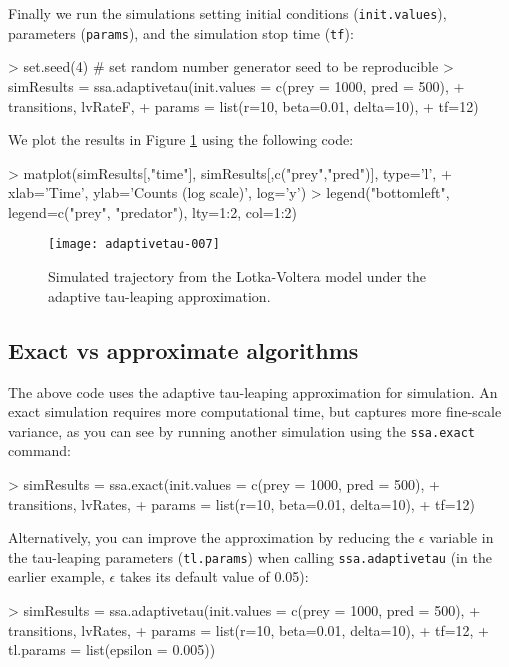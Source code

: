 \documentclass[11pt,nogin]{article}
\begin{document}
Finally we run the simulations setting initial conditions (\texttt{init.values}), parameters (\texttt{params}), and the simulation stop time (\texttt{tf}):
\begin{Schunk}
\begin{Sinput}
> set.seed(4) # set random number generator seed to be reproducible
> simResults = ssa.adaptivetau(init.values = c(prey = 1000, pred = 500),
+                              transitions, lvRateF,
+                              params = list(r=10, beta=0.01, delta=10),
+                              tf=12)
\end{Sinput}
\end{Schunk}
We plot the results in Figure \ref{fig-lv} using the following code:
\begin{Schunk}
\begin{Sinput}
> matplot(simResults[,"time"], simResults[,c("prey","pred")], type='l',
+         xlab='Time', ylab='Counts (log scale)', log='y')
> legend("bottomleft", legend=c("prey", "predator"), lty=1:2, col=1:2)
\end{Sinput}
\end{Schunk}

\begin{figure}
  \centerline{
\texttt{[image: adaptivetau-007]}
}\caption{\label{fig-lv} Simulated trajectory from the Lotka-Voltera model under the adaptive tau-leaping approximation.}
\end{figure}

\subsection*{Exact vs approximate algorithms}
The above code uses the adaptive tau-leaping approximation for simulation.  An exact simulation requires more computational time, but captures more fine-scale variance, as you can see by running another simulation using the \texttt{ssa.exact} command:
\begin{Schunk}
\begin{Sinput}
> simResults = ssa.exact(init.values = c(prey = 1000, pred = 500),
+                        transitions, lvRates,
+                        params = list(r=10, beta=0.01, delta=10),
+                        tf=12)
\end{Sinput}
\end{Schunk}
Alternatively, you can improve the approximation by reducing the $\epsilon$ variable in the tau-leaping parameters (\texttt{tl.params}) when calling \texttt{ssa.adaptivetau} (in the earlier example, $\epsilon$ takes its default value of 0.05):
\begin{Schunk}
\begin{Sinput}
> simResults = ssa.adaptivetau(init.values = c(prey = 1000, pred = 500),
+                              transitions, lvRates,
+                              params = list(r=10, beta=0.01, delta=10),
+                              tf=12,
+                              tl.params = list(epsilon = 0.005))
\end{Sinput}
\end{Schunk}
\end{document}
